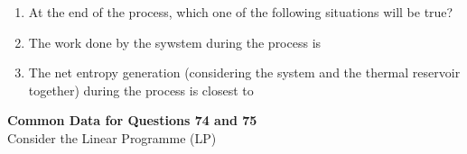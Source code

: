 \documentclass[journal,12pt,onecolumn]{IEEEtran}
\begin{document}
\begin{enumerate}[resume]
    \item At the end of the process, which one of the following situations will be true?
          \begin{enumerate}
          \end{enumerate}

    \item The work done by the sywstem during the process is
          \begin{enumerate}
          \end{enumerate}

    \item The net entropy generation (considering the system and the thermal reservoir together) during the process is closest to
          \begin{enumerate}
          \end{enumerate}

\end{enumerate}
\normalsize\textbf{Common Data for Questions 74 and 75}\\
Consider the Linear Programme (LP)\\\\
\end{document}
